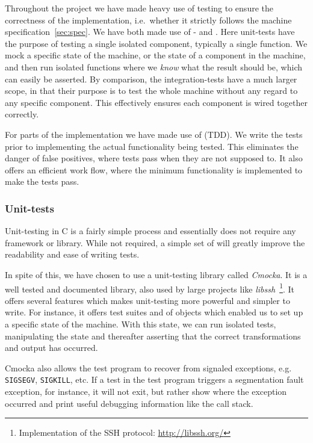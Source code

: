 Throughout the project we have made heavy use of testing to ensure the
correctness of the implementation, i.e.~whether it strictly follows the machine
specification~\ref{sec:spec}. We have both made use of - and
. Here unit-tests have the purpose of testing a single
isolated component, typically a single function. We mock a specific state of the
machine, or the state of a component in the machine, and then run isolated
functions where we {\it know} what the result should be, which can easily be
asserted. By comparison, the integration-tests have a much larger scope, in that
their purpose is to test the whole machine without any regard to any specific
component. This effectively ensures each component is wired together correctly.

For parts of the implementation we have made use of  (TDD). We write the tests prior to implementing the actual
functionality being tested. This eliminates the danger of false positives, where
tests pass when they are not supposed to. It also offers an efficient work flow,
where the minimum functionality is implemented to make the tests pass.

\subsubsection{Unit-tests}

Unit-testing in C is a fairly simple process and essentially does not require
any framework or library. While not required, a simple set of  will
greatly improve the readability and ease of writing tests.

In spite of this, we have chosen to use a unit-testing library called {\it
  Cmocka}\cite{cmocka}. It is a well tested and documented library, also used by
large projects like {\it libssh}~\footnote{Implementation of the SSH protocol:
  \url{http://libssh.org/}}. It offers several features which makes unit-testing
more powerful and simpler to write. For instance, it offers test suites and
 of objects which enabled us to set up a specific state of the
machine. With this state, we can run isolated tests, manipulating the state and
thereafter asserting that the correct transformations and output has occurred.

Cmocka also allows the test program to recover from signaled exceptions,
e.g. {\tt SIGSEGV}, {\tt SIGKILL}, etc. If a test in the test program triggers a
segmentation fault exception, for instance, it will not exit, but rather show
where the exception occurred and print useful debugging information like the
call stack.

